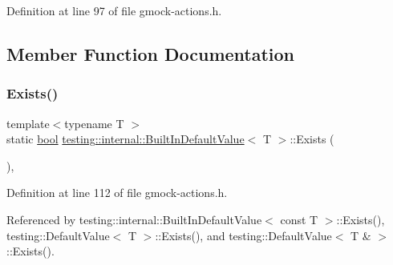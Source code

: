Definition at line 97 of file gmock-\/actions.\+h.



\subsection{Member Function Documentation}
\mbox{\label{classtesting_1_1internal_1_1BuiltInDefaultValue_a35207bc20a493b0efb3980eb9a08dd2f}} 
\subsubsection{\texorpdfstring{Exists()}{Exists()}}
{\footnotesize\ttfamily template$<$typename T $>$ \\
static \hyperlink{classbool}{bool} \hyperlink{classtesting_1_1internal_1_1BuiltInDefaultValue}{testing\+::internal\+::\+Built\+In\+Default\+Value}$<$ T $>$\+::Exists (\begin{DoxyParamCaption}{ }\end{DoxyParamCaption})\hspace{0.3cm}{\ttfamily [inline]}, {\ttfamily [static]}}



Definition at line 112 of file gmock-\/actions.\+h.



Referenced by testing\+::internal\+::\+Built\+In\+Default\+Value$<$ const T $>$\+::\+Exists(), testing\+::\+Default\+Value$<$ T $>$\+::\+Exists(), and testing\+::\+Default\+Value$<$ T \& $>$\+::\+Exists().


